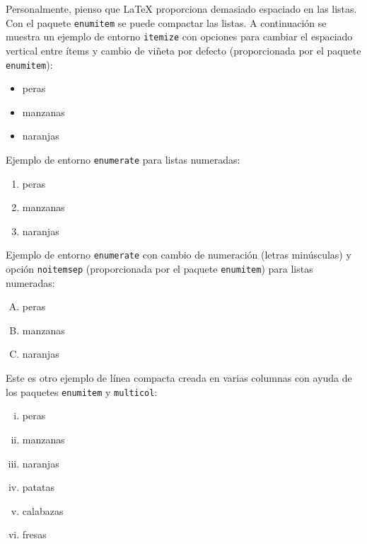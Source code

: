 \documentclass[11pt,a4paper]{article}
\begin{document}
Personalmente, pienso que \LaTeX{} proporciona demasiado espaciado en las listas. Con el paquete \texttt{enumitem} se puede compactar las listas. A continuación se muestra un ejemplo de entorno {\tt itemize} con opciones para cambiar el espaciado vertical entre ítems y cambio de viñeta por defecto (proporcionada por el paquete \texttt{enumitem}):

\begin{itemize}[\textbullet,noitemsep]
	\item peras
	\item manzanas
	\item naranjas
\end{itemize}

\noindent Ejemplo de entorno {\tt enumerate} para listas numeradas:

\begin{enumerate}
	\item peras
	\item manzanas
	\item naranjas
\end{enumerate}


\noindent Ejemplo de entorno {\tt enumerate} con cambio de numeración (letras minúsculas) y opción \texttt{noitemsep} (proporcionada por el paquete \texttt{enumitem}) para listas numeradas:

\begin{enumerate}[A.-,noitemsep]
	\item peras
	\item manzanas
	\item naranjas
\end{enumerate}

\noindent Este es otro ejemplo de línea compacta creada en varias columnas con ayuda de los paquetes \texttt{enumitem} y \texttt{multicol}:
\begin{multicols}{2} %
	\begin{enumerate}[i.,noitemsep]
		\item peras
		\item manzanas
		\item naranjas
		\item patatas
		\item calabazas
		\item fresas
	\end{enumerate}
\end{multicols}
\end{document}
